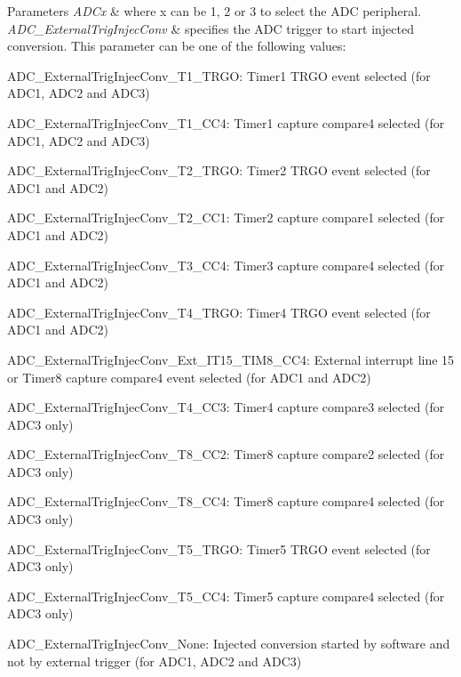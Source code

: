 \begin{DoxyParams}{Parameters}
{\em A\+D\+Cx} & where x can be 1, 2 or 3 to select the A\+DC peripheral. \\
\hline
{\em A\+D\+C\+\_\+\+External\+Trig\+Injec\+Conv} & specifies the A\+DC trigger to start injected conversion. This parameter can be one of the following values\+: \begin{DoxyItemize}
\item A\+D\+C\+\_\+\+External\+Trig\+Injec\+Conv\+\_\+\+T1\+\_\+\+T\+R\+GO\+: Timer1 T\+R\+GO event selected (for A\+D\+C1, A\+D\+C2 and A\+D\+C3) \item A\+D\+C\+\_\+\+External\+Trig\+Injec\+Conv\+\_\+\+T1\+\_\+\+C\+C4\+: Timer1 capture compare4 selected (for A\+D\+C1, A\+D\+C2 and A\+D\+C3) \item A\+D\+C\+\_\+\+External\+Trig\+Injec\+Conv\+\_\+\+T2\+\_\+\+T\+R\+GO\+: Timer2 T\+R\+GO event selected (for A\+D\+C1 and A\+D\+C2) \item A\+D\+C\+\_\+\+External\+Trig\+Injec\+Conv\+\_\+\+T2\+\_\+\+C\+C1\+: Timer2 capture compare1 selected (for A\+D\+C1 and A\+D\+C2) \item A\+D\+C\+\_\+\+External\+Trig\+Injec\+Conv\+\_\+\+T3\+\_\+\+C\+C4\+: Timer3 capture compare4 selected (for A\+D\+C1 and A\+D\+C2) \item A\+D\+C\+\_\+\+External\+Trig\+Injec\+Conv\+\_\+\+T4\+\_\+\+T\+R\+GO\+: Timer4 T\+R\+GO event selected (for A\+D\+C1 and A\+D\+C2) \item A\+D\+C\+\_\+\+External\+Trig\+Injec\+Conv\+\_\+\+Ext\+\_\+\+I\+T15\+\_\+\+T\+I\+M8\+\_\+\+C\+C4\+: External interrupt line 15 or Timer8 capture compare4 event selected (for A\+D\+C1 and A\+D\+C2) \item A\+D\+C\+\_\+\+External\+Trig\+Injec\+Conv\+\_\+\+T4\+\_\+\+C\+C3\+: Timer4 capture compare3 selected (for A\+D\+C3 only) \item A\+D\+C\+\_\+\+External\+Trig\+Injec\+Conv\+\_\+\+T8\+\_\+\+C\+C2\+: Timer8 capture compare2 selected (for A\+D\+C3 only) \item A\+D\+C\+\_\+\+External\+Trig\+Injec\+Conv\+\_\+\+T8\+\_\+\+C\+C4\+: Timer8 capture compare4 selected (for A\+D\+C3 only) \item A\+D\+C\+\_\+\+External\+Trig\+Injec\+Conv\+\_\+\+T5\+\_\+\+T\+R\+GO\+: Timer5 T\+R\+GO event selected (for A\+D\+C3 only) \item A\+D\+C\+\_\+\+External\+Trig\+Injec\+Conv\+\_\+\+T5\+\_\+\+C\+C4\+: Timer5 capture compare4 selected (for A\+D\+C3 only) \item A\+D\+C\+\_\+\+External\+Trig\+Injec\+Conv\+\_\+\+None\+: Injected conversion started by software and not by external trigger (for A\+D\+C1, A\+D\+C2 and A\+D\+C3) \end{DoxyItemize}
\\
\hline
\end{DoxyParams}

